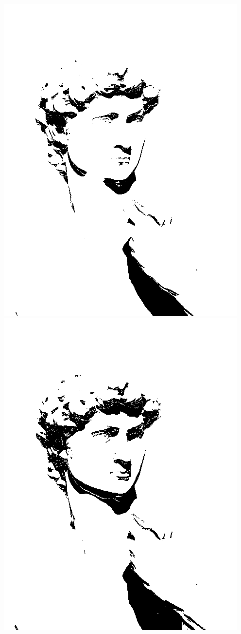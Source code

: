 \documentclass[12pt]{article}
\begin{document}
\includegraphics[scale=0.18]{c.jpg}
\includegraphics[scale=0.18]{d.jpg}
\end{document}
